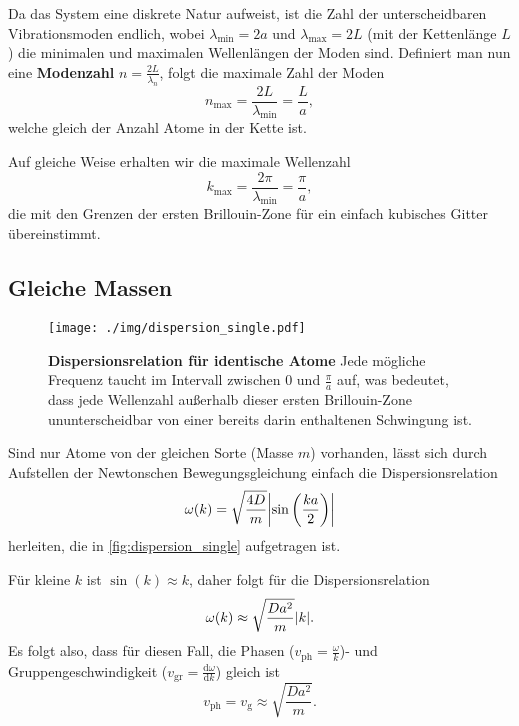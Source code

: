 Da das System eine diskrete Natur aufweist, ist die Zahl der unterscheidbaren Vibrationsmoden endlich, wobei $\lambda_\text{min}=2a$ und $\lambda_\text{max}=2L$ (mit der Kettenlänge $L$) die minimalen und maximalen Wellenlängen der Moden sind.
Definiert man nun eine \textbf{Modenzahl} $n=\frac{2L}{\lambda_n}$, folgt die maximale Zahl der Moden
\begin{equation*}
	n_\text{max}=\frac{2L}{\lambda_\text{min}}=\frac{L}{a},
\end{equation*}
welche gleich der Anzahl Atome in der Kette ist.

Auf gleiche Weise erhalten wir die maximale Wellenzahl
\begin{equation*}
	k_\text{max}=\frac{2\pi}{\lambda_\text{min}}=\frac{\pi}{a},
\end{equation*}
die mit den Grenzen der ersten Brillouin-Zone für ein einfach kubisches Gitter übereinstimmt.

\subsection{Gleiche Massen}
\begin{figure}[tbp]
	\centering
	\texttt{[image: ./img/dispersion\_single.pdf]}
	\caption{\textbf{Dispersionsrelation für identische Atome} Jede mögliche Frequenz taucht im Intervall zwischen 0 und $\frac{\pi}{a}$ auf, was bedeutet, dass jede Wellenzahl außerhalb dieser ersten Brillouin-Zone ununterscheidbar von einer bereits darin enthaltenen Schwingung ist.}
	\label{fig:dispersion_single}
\end{figure}
Sind nur Atome von der gleichen Sorte (Masse $m$) vorhanden, lässt sich durch Aufstellen der Newtonschen Bewegungsgleichung einfach die Dispersionsrelation
\begin{equation}
	\omega(k) = \sqrt{\frac{4D}{m}}\abs{\sin\left(\frac{ka}{2}\right)}
\end{equation}
herleiten, die in \autoref{fig:dispersion_single} aufgetragen ist.

Für kleine $k$ ist $\sin(k)\approx k$, daher folgt für die Dispersionsrelation
\begin{equation*}
	\omega(k)\approx \sqrt{\frac{Da^2}{m}}\abs{k}.
\end{equation*}
Es folgt also, dass für diesen Fall, die Phasen ($v_\text{ph}=\frac{\omega}{k}$)- und Gruppengeschwindigkeit ($v_\text{gr}=\frac{\text{d}\omega}{\text{d}k}$) gleich ist
\begin{equation}\label{eq:sound_single}
	v_\text{ph} = v_\text{g}\approx \sqrt{\frac{Da^2}{m}}.
\end{equation}

